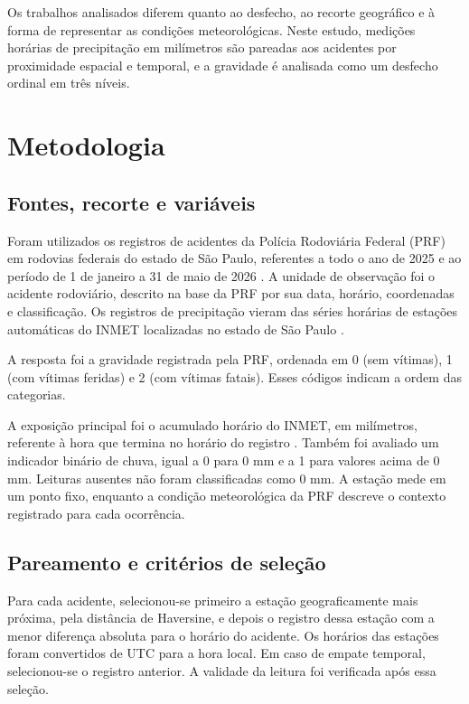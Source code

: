\documentclass[12pt]{article}
\begin{document}
Os trabalhos analisados diferem quanto ao desfecho, ao recorte geográfico
e à forma de representar as condições meteorológicas. Neste estudo, medições
horárias de precipitação em milímetros são pareadas aos acidentes por
proximidade espacial e temporal, e a gravidade é analisada como um desfecho
ordinal em três níveis.

\section{Metodologia}

\subsection{Fontes, recorte e variáveis}

Foram utilizados os registros de acidentes da Polícia Rodoviária Federal
(PRF) em rodovias federais do estado de São Paulo, referentes a todo o ano
de 2025 e ao período de 1 de janeiro a 31 de maio de 2026 \cite{prf2026}.
A unidade de observação foi o acidente rodoviário, descrito na base
da PRF por sua data, horário, coordenadas e classificação. Os registros de
precipitação vieram das séries horárias de estações automáticas do INMET
localizadas no estado de São Paulo \cite{inmet2026}.

A resposta foi a gravidade registrada pela PRF, ordenada em 0 (sem
vítimas), 1 (com vítimas feridas) e 2 (com vítimas fatais). Esses códigos
indicam a ordem das categorias.

A exposição principal foi o acumulado horário do INMET, em milímetros,
referente à hora que termina no horário do registro \cite{inmetglossario}.
Também foi avaliado um indicador binário de chuva, igual a 0 para 0 mm
e a 1 para valores acima de 0 mm. Leituras ausentes não foram classificadas
como 0 mm. A estação mede em um ponto fixo, enquanto a condição
meteorológica da PRF descreve o contexto registrado para cada ocorrência.

\subsection{Pareamento e critérios de seleção}

Para cada acidente, selecionou-se primeiro a estação geograficamente
mais próxima, pela distância de Haversine, e depois o registro dessa
estação com a menor diferença absoluta para o horário do acidente.
Os horários das estações foram convertidos de UTC para a hora local.
Em caso de empate temporal, selecionou-se o registro anterior. A
validade da leitura foi verificada após essa seleção.
\end{document}
